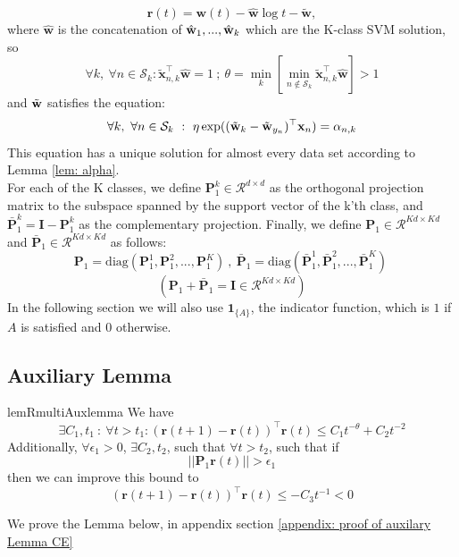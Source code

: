 \documentclass[twoside,11pt,english]{article}
\newcommand{\xtilde}{\tilde{\vect{x}}_{n,k}}
\newcommand{\vect}[1]{\mathbf{#1}}
\newcommand{\bm}[1]{\ensuremath{\boldsymbol{#1}}}
\newcommand{\indicator}[1]{\bm{1}_{\{ #1 \}}}
\begin{document}
\begin{equation} \label{eq:rdef}
\vect{r}(t)=\vect{w}(t)-\hat{\vect{w}}\log t -\tilde{\vect{w}},
\end{equation}
where $\hat{\vect{w}}$ is the concatenation of $\hat{\mathbf{w}}_1,...,\hat{\mathbf{w}}_k$ which are the K-class SVM solution, so\\
\begin{equation} \label{eq:1}
\forall k,\ \forall n\in\mathcal{S}_k: \xtilde^\top\hat{\vect{w}}=1\ ;\ \theta = \min_{k}\left[\min_{n\notin\mathcal{S}_k}\xtilde^\top\hat{\vect{w}}\right]>1 
\end{equation}
and $\tilde{\mathbf{w}}$ satisfies the equation:
\begin{equation} \label{eq:alpha_def}
\forall k,\ \forall n\in \mathcal{S}_k\ : \ \eta \e( (\tilde{\vect{w}}_k - \tilde{\vect{w}}_{y_n})^\top \vect{x}_n) = \alpha_{n,k}
\end{equation}
This equation has a unique solution for almost every data set according to Lemma \ref{lem: alpha}.\\
For each of the K classes, we define $\mathcal{\vect{P}}^k_1\in\mathcal{R}^{d \times d}$ as the orthogonal projection matrix to the subspace spanned by the support vector of the k'th class, and $\mathcal{\bar{\vect{P}}}^k_1=\vect{I}-\mathcal{\vect{P}}^k_1$ as the complementary projection.
Finally, we define $ \mathcal{\vect{P}}_1\in \mathcal{R}^{Kd \times Kd}$ and $ \mathcal{\bar{\vect{P}}}_1\in \mathcal{R}^{Kd \times Kd}$ as follows: 
$$
\mathcal{\vect{P}}_1= \mathrm{diag}(\mathcal{\vect{P}}^1_1,\mathcal{\vect{P}}^2_1,...,\mathcal{\vect{P}}^K_1)\ ,\  
\mathcal{\bar{\vect{P}}}_1= \mathrm{diag}(\mathcal{\bar{\vect{P}}}^1_1,\mathcal{\bar{\vect{P}}}^2_1,...,\mathcal{\bar{\vect{P}}}^K_1)\ 
$$
$$(\mathcal{\vect{P}}_1+\mathcal{\bar{\vect{P}}}_1=\vect{I}\in \mathcal{R}^{Kd \times Kd})$$
In the following section we will also use $\indicator{A}$, the indicator function, which is $1$ if $A$ is satisfied and 0 otherwise.
\subsection{Auxiliary Lemma}
\begin{restatable}{lemR}{multiAuxlemma}
	\label{lemma:1}
	We have
	\begin{equation} \label{eq:lemma}
	\exists C_1, t_1\ :\ \forall t>t_1 : (\vect{r}(t+1)-\vect{r}(t))^\top\vect{r}(t)\le C_1t^{-\theta}+C_2t^{-2}
	\end{equation}
	Additionally, $\forall \epsilon_1>0$, $\exists C_2,t_2$, such that $\forall t>t_2$, such that if
	\begin{equation} \label{eq:P_ge_epsilon1}
	||\mathcal{\vect{P}}_1\vect{r}(t)||>\epsilon_1
	\end{equation}
	then we can improve this bound to
	\begin{equation} \label{eq:lemmaImproved}
	\left(\vect{r}(t+1)-\vect{r}(t)\right)^\top\vect{r}(t)\le-C_3t^{-1}<0
	\end{equation}
\end{restatable}
We prove the Lemma below, in appendix section \ref{appendix: proof of auxilary Lemma CE}
\end{document}
